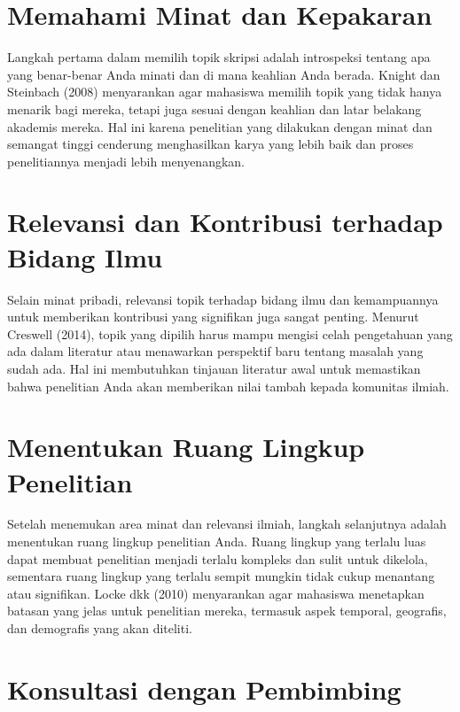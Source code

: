 \documentclass[
  indonesian,
  letterpaper,
]{scrbook}
\begin{document}
\section{Memahami Minat dan
Kepakaran}\label{memahami-minat-dan-kepakaran}

Langkah pertama dalam memilih topik skripsi adalah introspeksi tentang
apa yang benar-benar Anda minati dan di mana keahlian Anda berada.
Knight dan Steinbach (2008) menyarankan agar mahasiswa memilih topik
yang tidak hanya menarik bagi mereka, tetapi juga sesuai dengan keahlian
dan latar belakang akademis mereka. Hal ini karena penelitian yang
dilakukan dengan minat dan semangat tinggi cenderung menghasilkan karya
yang lebih baik dan proses penelitiannya menjadi lebih menyenangkan.

\section{Relevansi dan Kontribusi terhadap Bidang
Ilmu}\label{relevansi-dan-kontribusi-terhadap-bidang-ilmu}

Selain minat pribadi, relevansi topik terhadap bidang ilmu dan
kemampuannya untuk memberikan kontribusi yang signifikan juga sangat
penting. Menurut Creswell (2014), topik yang dipilih harus mampu mengisi
celah pengetahuan yang ada dalam literatur atau menawarkan perspektif
baru tentang masalah yang sudah ada. Hal ini membutuhkan tinjauan
literatur awal untuk memastikan bahwa penelitian Anda akan memberikan
nilai tambah kepada komunitas ilmiah.

\section{Menentukan Ruang Lingkup
Penelitian}\label{menentukan-ruang-lingkup-penelitian}

Setelah menemukan area minat dan relevansi ilmiah, langkah selanjutnya
adalah menentukan ruang lingkup penelitian Anda. Ruang lingkup yang
terlalu luas dapat membuat penelitian menjadi terlalu kompleks dan sulit
untuk dikelola, sementara ruang lingkup yang terlalu sempit mungkin
tidak cukup menantang atau signifikan. Locke dkk (2010) menyarankan agar
mahasiswa menetapkan batasan yang jelas untuk penelitian mereka,
termasuk aspek temporal, geografis, dan demografis yang akan diteliti.

\section{Konsultasi dengan
Pembimbing}\label{konsultasi-dengan-pembimbing}
\end{document}
